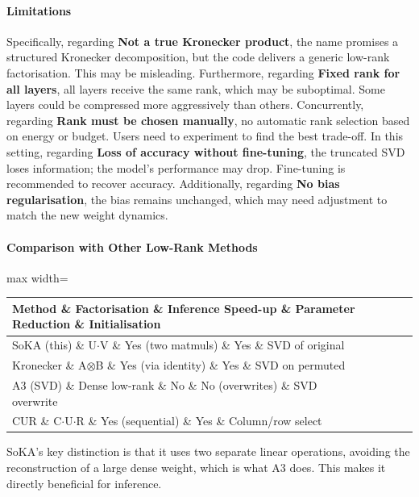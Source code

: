 \paragraph{Limitations}

Specifically, regarding \textbf{Not a true Kronecker product}, the name promises a structured Kronecker decomposition, but the code delivers a generic low-rank factorisation. This may be misleading. Furthermore, regarding \textbf{Fixed rank for all layers}, all layers receive the same rank, which may be suboptimal. Some layers could be compressed more aggressively than others. Concurrently, regarding \textbf{Rank must be chosen manually}, no automatic rank selection based on energy or budget. Users need to experiment to find the best trade-off. In this setting, regarding \textbf{Loss of accuracy without fine-tuning}, the truncated SVD loses information; the model's performance may drop. Fine-tuning is recommended to recover accuracy. Additionally, regarding \textbf{No bias regularisation}, the bias remains unchanged, which may need adjustment to match the new weight dynamics.


\paragraph{Comparison with Other Low-Rank Methods}

\begin{center}
\begin{adjustbox}{max width=\columnwidth}
\renewcommand{\arraystretch}{1.2}
\begin{tabular}{lllll}
\toprule
Method \& Factorisation \& Inference Speed-up \& Parameter Reduction \& Initialisation \\
\midrule
SoKA (this) \& U$\cdot$V \& Yes (two matmuls) \& Yes \& SVD of original \\
Kronecker \& A$\otimes$B \& Yes (via identity) \& Yes \& SVD on permuted \\
A3 (SVD) \& Dense low-rank \& No \& No (overwrites) \& SVD overwrite \\
CUR \& C$\cdot$U$\cdot$R \& Yes (sequential) \& Yes \& Column/row select \\

\bottomrule
\end{tabular}
\end{adjustbox}
\end{center}
SoKA's key distinction is that it uses two separate linear operations, avoiding the reconstruction of a large dense weight, which is what A3 does. This makes it directly beneficial for inference.


